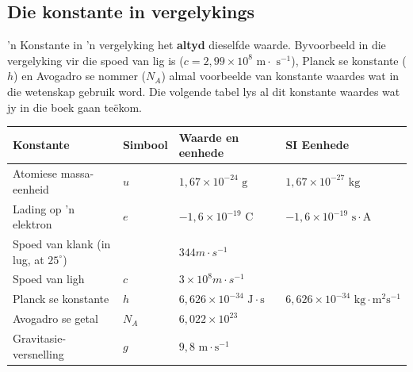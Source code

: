 \subsection*{Die konstante in vergelykings}
 'n Konstante in  'n vergelyking het \textbf{altyd} dieselfde waarde. Byvoorbeeld in die vergelyking vir die spoed van lig is ($c = 2,99 \times 10^{8} \text{ m} \cdot \text{ s}^{-1}$), Planck se konstante ($h$) en Avogadro se nommer ($N_A$) almal voorbeelde van konstante waardes wat in die wetenskap gebruik word. Die volgende tabel lys al dit konstante waardes wat jy in die boek gaan teëkom.
\begin{table}[H]
 \begin{center}
  \begin{tabular}{|l|l|l|l|}\hline
   \textbf{Konstante} & Simbool & \textbf{Waarde en eenhede} & \textbf{SI Eenhede} \\ \hline
Atomiese massa-eenheid & $u$ & $1,67 \times 10^{-24} \text{ g}$ & $1,67 \times 10^{-27} \text{ kg}$ \\ \hline
Lading op 'n elektron & $e$ & $-1,6 \times 10^{-19} \text{ C}$ & $-1,6 \times 10^{-19} \text{ s}\cdot \text{A}$ \\ \hline
Spoed van klank (in lug, at $25^{\circ}$) & & \multicolumn{2}{l|}{$344 m \cdot s^{-1}$} \\ \hline
Spoed van ligh & $c$ & \multicolumn{2}{l|}{$3 \times 10^{8} m \cdot s^{-1}$} \\ \hline
Planck se konstante & $h$ & $6,626 \times 10^{-34} \text{ J} \cdot \text{s}$ & $6,626 \times 10^{-34} \text{ kg} \cdot \text{m}^{2} \text{s}^{-1}$ \\ \hline
Avogadro se getal & $N_{A}$ & \multicolumn{2}{l|}{$6,022 \times 10^{23}$} \\ \hline
Gravitasie-versnelling & $g$ & \multicolumn{2}{l|}{$9,8 \text{ m} \cdot \text{s}^{-1}$} \\ \hline  
  \end{tabular}
 \end{center}
\end{table}

